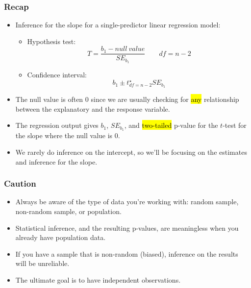 \documentclass[notes,11pt, aspectratio=169]{beamer}
\begin{document}
\begin{frame}
\frametitle{Recap}

\begin{itemize}

\item Inference for the slope for a single-predictor linear regression model:
\pause
\begin{itemize}
\item Hypothesis test:
\[ T = \frac{b_1 - null~value}{SE_{b_1}} \qquad df = n - 2 \]
\pause
\item Confidence interval:
\[ b_1 \pm t^\star_{df = n - 2} SE_{b_1} \]
\end{itemize}

\pause

\item The null value is often 0 since we are usually checking for \hl{any} relationship between the explanatory and the response variable.

\pause

\item The regression output gives $b_1$, $SE_{b_1}$, and \hl{two-tailed} p-value for the $t$-test for the slope where the null value is 0.

\pause

\item We rarely do inference on the intercept, so we'll be focusing on the estimates and inference for the slope.

\end{itemize}

\end{frame}



\begin{frame}
\frametitle{Caution}

\begin{itemize}

\item Always be aware of the type of data you're working with: random sample, non-random sample, or population.

\pause

\item Statistical inference, and the resulting p-values, are meaningless when you already have population data.

\pause

\item If you have a sample that is non-random (biased), inference on the results will be unreliable.

\pause

\item The ultimate goal is to have independent observations.

\end{itemize}

\end{frame}

\end{document}
